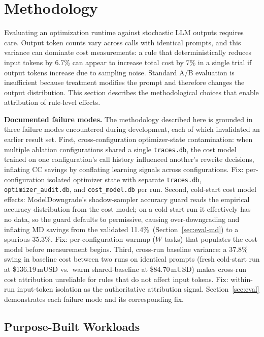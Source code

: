 \documentclass[sigconf,9pt]{acmart}
\begin{document}
\section{Methodology}
\label{sec:methodology}

Evaluating an optimization runtime against stochastic LLM outputs requires care.
Output token counts vary across calls with identical prompts, and this variance can
dominate cost measurements: a rule that deterministically reduces input tokens by
6.7\% can appear to increase total cost by 7\% in a single trial if output tokens
increase due to sampling noise. Standard A/B evaluation is insufficient because
treatment modifies the prompt and therefore changes the output distribution. This
section describes the methodological choices that enable attribution of rule-level
effects.

\textbf{Documented failure modes.} The methodology described here is grounded in
three failure modes encountered during development, each of which invalidated an
earlier result set. First, cross-configuration optimizer-state contamination: when
multiple ablation configurations shared a single \texttt{traces.db}, the cost model
trained on one configuration's call history influenced another's rewrite decisions,
inflating CC savings by conflating learning signals across configurations. Fix:
per-configuration isolated optimizer state with separate \texttt{traces.db},
\texttt{optimizer\_audit.db}, and \texttt{cost\_model.db} per run. Second, cold-start
cost model effects: ModelDowngrade's shadow-sampler accuracy guard reads the empirical
accuracy distribution from the cost model; on a cold-start run it effectively has no
data, so the guard defaults to permissive, causing over-downgrading and inflating MD
savings from the validated 11.4\%~(Section~\ref{sec:eval-md}) to a spurious 35.3\%. Fix: per-configuration warmup
($W$ tasks) that populates the cost model before measurement begins. Third, cross-run
baseline variance: a 37.8\% swing in baseline cost between two runs on identical
prompts (fresh cold-start run at \$136.19\,mUSD vs.\ warm shared-baseline at
\$84.70\,mUSD) makes cross-run cost attribution unreliable for rules that do not
affect input tokens. Fix: within-run input-token isolation as the authoritative
attribution signal. Section~\ref{sec:eval} demonstrates each failure mode and its
corresponding fix.

\subsection{Purpose-Built Workloads}
\end{document}
